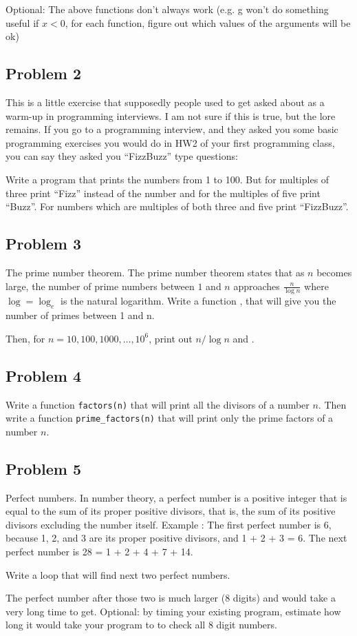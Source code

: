 \documentclass[letterpaper,11pt]{amsart}
\theoremstyle{plain}
\theoremstyle{definition}
\begin{document}
Optional: The above functions don't always work (e.g. g won't do something useful if $x<0$, for each function, figure out which values of the arguments will be ok)

\subsection*{Problem 2} 
This is a little exercise that supposedly people used to get asked about as a warm-up in programming interviews. I am not sure if this is true, but the lore remains. If you go to a programming interview, and they asked you some basic programming exercises you would do in HW2 of your first programming class, you can say they asked you ``FizzBuzz'' type questions: 

Write a program that prints the numbers from 1 to 100. But for multiples of three print “Fizz” instead of the number and for the multiples of five print “Buzz”. For numbers which are multiples of both three and five print “FizzBuzz”.

\subsection*{Problem 3} The prime number theorem. The prime number theorem states that as $n$ becomes large, the number of prime numbers between $1$ and $n$ approaches $\frac{n}{\log n}$ where $\log = \log_e$ is the natural logarithm. Write a function , that will give you the number of primes between 1 and n.   

Then, for $n = 10,100,1000,\dots, 10^{6}$, print out $n/\log n$ and .


\subsection*{Problem 4} Write a function {\texttt{factors(n)}} that will print all the divisors of a number $n$. Then write a function {\texttt{prime\_factors(n)}} that will print only the prime factors of a number $n$. 

\subsection*{Problem 5} Perfect numbers. In number theory, a perfect number is a positive integer that is equal to the sum of its proper positive divisors, that is, the sum of its positive divisors excluding the number itself. 
Example : The first perfect number is 6, because 1, 2, and 3 are its proper positive divisors, and 1 + 2 + 3 = 6. The next perfect number is 28 = 1 + 2 + 4 + 7 + 14. 

Write a loop that will find next two perfect numbers. 

The perfect number after those two is much larger (8 digits) and would take a very long time to get. Optional: by timing your existing program, estimate how long it would take your program to to check all 8 digit numbers.  
\end{document}
